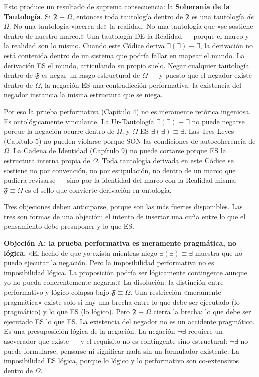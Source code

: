 \documentclass[10pt, openany, oneside]{book}
\begin{document}
Esto produce un resultado de suprema consecuencia: la \textbf{Soberanía de la Tautología}. Si $\mathfrak{F} \equiv \Omega$, entonces toda tautología dentro de $\mathfrak{F}$ es una tautología \textit{de} $\Omega$. No una tautología «acerca de» la realidad. No una tautología que «se sostiene dentro de nuestro marco.» Una tautología DE la Realidad --- porque el marco y la realidad son lo mismo. Cuando este Códice deriva $\exists(\exists) \equiv \exists$, la derivación no está contenida dentro de un sistema que podría fallar en mapear el mundo. La derivación ES el mundo, articulando su propio suelo. Negar cualquier tautología dentro de $\mathfrak{F}$ es negar un rasgo estructural de $\Omega$ --- y puesto que el negador existe dentro de $\Omega$, la negación ES una contradicción performativa: la existencia del negador instancia la misma estructura que se niega.

Por eso la prueba performativa (Capítulo 4) no es meramente retórica ingeniosa. Es ontológicamente vinculante. La Ur-Tautología $\exists(\exists) \equiv \exists$ no puede negarse porque la negación ocurre dentro de $\Omega$, y $\Omega$ ES $\exists(\exists) \equiv \exists$. Las Tres Leyes (Capítulo 5) no pueden violarse porque SON las condiciones de autocoherencia de $\Omega$. La Cadena de Identidad (Capítulo 9) no puede cortarse porque ES la estructura interna propia de $\Omega$. Toda tautología derivada en este Códice se sostiene no por convención, no por estipulación, no dentro de un marco que pudiera revisarse --- sino por la identidad del marco con la Realidad misma. $\mathfrak{F} \equiv \Omega$ es el sello que convierte derivación en ontología.

Tres objeciones deben anticiparse, porque son las más fuertes disponibles. Las tres son formas de una objeción: el intento de insertar una cuña entre lo que el pensamiento debe presuponer y lo que ES.

\textbf{Objeción A: la prueba performativa es meramente pragmática, no lógica.} «El hecho de que yo exista mientras niego $\exists(\exists) \equiv \exists$ muestra que no puedo ejecutar la negación. Pero la imposibilidad performativa no es imposibilidad lógica. La proposición podría ser lógicamente contingente aunque yo no pueda coherentemente negarla.» La disolución: la distinción entre performativo y lógico colapsa bajo $\mathfrak{F} \equiv \Omega$. Una restricción «meramente pragmática» existe solo si hay una brecha entre lo que debe ser ejecutado (lo pragmático) y lo que ES (lo lógico). Pero $\mathfrak{F} \equiv \Omega$ cierra la brecha: lo que debe ser ejecutado ES lo que ES. La existencia del negador no es un accidente pragmático. Es una presuposición lógica de la negación. La negación $\neg\exists$ requiere un aseverador que existe --- y el requisito no es contingente sino estructural: $\neg\exists$ no puede formularse, pensarse ni significar nada sin un formulador existente. La imposibilidad ES lógica, porque lo lógico y lo performativo son co-extensivos dentro de $\Omega$.
\end{document}
